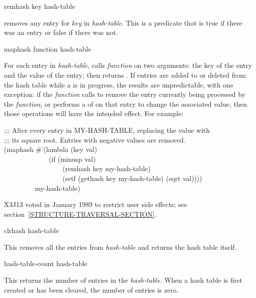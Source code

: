 \begin{defun}[Function]
remhash key hash-table

 removes
any entry for \emph{key} in \emph{hash-table}.  This is a predicate
that is true if there was an
entry or false if there was not.
\end{defun}

\begin{defun}[Function]
maphash function hash-table

For each entry in \emph{hash-table},  calls
\emph{function} on two arguments:
the key of the entry and the value of the entry;  then returns .
If entries are added to or deleted from the hash table while a 
is in progress, the results are unpredictable, with one exception:
if the \emph{function} calls  to remove the entry currently
being processed by the \emph{function}, or performs a  of
 on that entry to change the associated value, then those
operations will have the intended effect.
For example:
\begin{lisp}
;;; Alter every entry in MY-HASH-TABLE, replacing the value with \\
;;; its square root.  Entries with negative values are removed. \\
(maphash \#'(lambda (key val) \\
~~~~~~~~~~~~~(if (minusp val) \\
~~~~~~~~~~~~~~~~~(remhash key my-hash-table) \\
~~~~~~~~~~~~~~~~~(setf (gethash key my-hash-table) (sqrt val)))) \\
~~~~~~~~~my-hash-table)
\end{lisp}

\begin{new}
X3J13 voted in January 1989
to restrict user side effects; see section~\ref{STRUCTURE-TRAVERSAL-SECTION}.
\end{new}
\end{defun}

\begin{defun}[Function]
clrhash hash-table

This removes all the entries from \emph{hash-table}
and returns the hash table itself.
\end{defun}

\begin{defun}[Function]
hash-table-count hash-table

This returns the number of entries in the \emph{hash-table}.
When a hash table is first created or has been cleared,
the number of entries is zero.
\end{defun}

